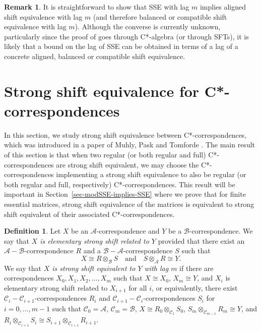 \documentclass[11pt, letterpaper,final]{amsart}
\newcommand{\A}{{\mathcal{A}}}
\newcommand{\B}{{\mathcal{B}}}
\newcommand{\C}{{\mathcal{C}}}
\theoremstyle{definition}
\newtheorem{dfn}[thm]{Definition}
\newtheorem{rmk}[thm]{Remark}
\begin{document}
\begin{rmk}
It is straightforward to show that SSE with lag $m$ implies aligned shift equivalence with lag $m$ (and therefore balanced or compatible shift equivalence with lag $m$). Although the converse is currently unknown, particularly since the proof of \cite[Theorem~1.3]{CDE} goes through C*-algebra (or through SFTs), it is likely that a bound on the lag of SSE can be obtained in terms of a lag of a concrete aligned, balanced or compatible shift equivalence.
\end{rmk}


\section{Strong shift equivalence for C*-correspondences}\label{sec-SSE-cor}

In this section, we study strong shift equivalence between C*-correspondences, which was introduced in a paper of Muhly, Pask and Tomforde \cite{MPT08}. The main result of this section is that when two regular (or both regular and full) C*-correspondences are strong shift equivalent, we may choose the C*-correspondences implementing a strong shift equivalence to also be regular (or both regular and full, respectively) C*-correspondences. This result will be important in Section~\ref{sec-modSSE-implies-SSE} where we prove that for finite essential matrices, strong shift equivalence of the matrices is equivalent to strong shift equivalent of their associated C*-correspondences. 


\begin{dfn}\label{dfn-SSE-corr}
Let $X$ be an $\A$-correspondence and $Y$ be a $\B$-correspondence.  We say that \emph{$X$ is elementary strong shift related to $Y$} provided that there exist an $\A-\B$-correspondence $R$ and a $\B-\A$-correspondence $S$ such that 
$$
X \cong R \otimes_\B S \quad \text{and} \quad S \otimes_\A R \cong Y.
$$
We say that \emph{$X$ is strong shift equivalent to $Y$ with lag $m$} if there are correspondences $X_0, X_1, X_2, \ldots, X_m$ such that $X \cong X_0$, $X_m \cong Y$, and $X_i$ is elementary strong shift related to $X_{i+1}$ for all $i$, or equivalently, there exist $\C_i-\C_{i+1}$-correspondences $R_i$ and $\C_{i+1}-\C_i$-correspondences $S_i$ for $i=0,\dots, m-1$ such that $\C_0=\A$, $\C_m = \B$, $X \cong R_0 \otimes_{\C_1} S_0$, $S_m \otimes_{\C_{m-1}} R_m \cong Y$, and $R_i \otimes_{\C_{i+1}} S_i \cong S_{i+1} \otimes_{\C_{i+1}} R_{i+1}$.
\end{dfn}
\end{document}
